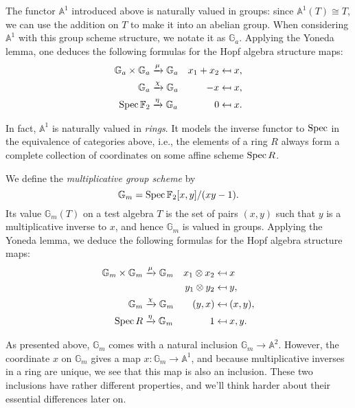 \begin{example}\label{InformalAdditiveGroupExample}
The functor $\mathbb A^1$ introduced above is naturally valued in groups: since $\mathbb A^1(T) \cong T$, we can use the addition on $T$ to make it into an abelian group.  When considering $\mathbb A^1$ with this group scheme structure, we notate it as $\mathbb G_a$.  Applying the Yoneda lemma, one deduces the following formulas for the Hopf algebra structure maps:
\begin{align*}
\mathbb G_a \times \mathbb G_a & \xrightarrow{\mu} \mathbb G_a & x_1 + x_2 & \mapsfrom x, \\
\mathbb G_a & \xrightarrow{\chi} \mathbb G_a & -x & \mapsfrom x, \\
\operatorname{Spec} \mathbb F_2 & \xrightarrow{\eta} \mathbb G_a & 0 & \mapsfrom x.
\end{align*}
\end{example}

\begin{remark}
In fact, $\mathbb A^1$ is naturally valued in \emph{rings}. It models the inverse functor to $\operatorname{Spec}$ in the equivalence of categories above, i.e., the elements of a ring $R$ always form a complete collection of coordinates on some affine scheme $\operatorname{Spec} R$.
\end{remark}

\begin{example}
We define the \textit{multiplicative group scheme} by \[\mathbb G_m = \operatorname{Spec} \mathbb F_2[x, y] / (xy - 1).\]  Its value $\mathbb G_m(T)$ on a test algebra $T$ is the set of pairs $(x, y)$ such that $y$ is a multiplicative inverse to $x$, and hence $\mathbb G_m$ is valued in groups.  Applying the Yoneda lemma, we deduce the following formulas for the Hopf algebra structure maps:
\begin{align*}
\mathbb G_m \times \mathbb G_m & \xrightarrow{\mu} \mathbb G_m & x_1 \otimes x_2 & \mapsfrom x \\
& & y_1 \otimes y_2 & \mapsfrom y, \\
\mathbb G_m & \xrightarrow{\chi} \mathbb G_m & (y, x) & \mapsfrom (x, y), \\
\operatorname{Spec} R & \xrightarrow{\eta} \mathbb G_m & 1 & \mapsfrom x, y.
\end{align*}
\end{example}

\begin{remark}
As presented above, $\mathbb G_m$ comes with a natural inclusion $\mathbb G_m \to \mathbb A^2$.  However, the coordinate $x$ on $\mathbb G_m$ gives a map $x: \mathbb G_m \to \mathbb A^1$, and because multiplicative inverses in a ring are unique, we see that this map is also an inclusion.  These two inclusions have rather different properties, and we'll think harder about their essential differences later on.
\end{remark}

